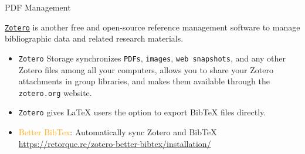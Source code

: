 \documentclass[
 size=14pt,
 paper=smartboard,  %
 mode=present, 		%
 display=slides, 	%
 style=tuliplab,  	%
 pauseslide,
 fleqn,leqno]{powerdot}{}
\begin{document}
\begin{slide}[toc=,bm=]{PDF Management}

\textcolor{orange}{\href{https://www.zotero.org/}{\texttt{Zotero}}} is another free and open-source reference management software to manage bibliographic data and related research materials.

\begin{itemize}
  \item \texttt{Zotero} Storage synchronizes \texttt{PDFs}, \texttt{images}, \texttt{web snapshots}, and any other Zotero files among all your computers, allows you to share your Zotero attachments in group libraries, and makes them available through the \texttt{zotero.org} website.
  \vspace{0.3cm}
  \item \texttt{Zotero} gives LaTeX users the option to export BibTeX files directly.
  \vspace{0.3cm}
  \item \textcolor{orange}{Better BibTex}: Automatically sync Zotero and BibTeX \url{https://retorque.re/zotero-better-bibtex/installation/}
\end{itemize}

\end{slide}
\end{document}
